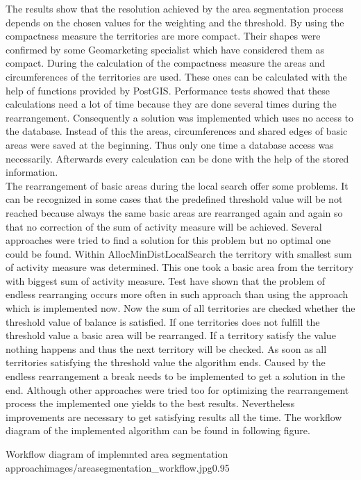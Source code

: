 The results show that the resolution achieved by the area segmentation process depends on the chosen values for the weighting and the threshold. By using the compactness measure the territories are more compact. Their shapes were confirmed by some Geomarketing specialist which have considered them as compact. During the calculation of the compactness measure the areas and circumferences of the territories are used. These ones can be calculated with the help of functions provided by PostGIS. Performance tests showed that these calculations need a lot of time because they are done several times during the rearrangement. Consequently a solution was implemented which uses no access to the database. Instead of this the areas, circumferences and shared edges of basic areas were saved at the beginning. Thus only one time a database access was necessarily. Afterwards every calculation can be done with the help of the stored information. \\
The rearrangement of basic areas during the local search offer some problems. It can be recognized in some cases that the predefined threshold value will be not reached because always the same basic areas are rearranged again and again so that no correction of the sum of activity measure will be achieved. Several approaches were tried to find a solution for this problem but no optimal one could be found. Within AllocMinDistLocalSearch the territory with smallest sum of activity measure was determined. This one took a basic area from the territory with biggest sum of activity measure. Test have shown that the problem of endless rearranging occurs more often in such approach than using the approach which is implemented now. Now the sum of all territories are checked whether the threshold value of balance is satisfied. If one territories does not fulfill the threshold value a basic area will be rearranged. If a territory satisfy the value nothing happens and thus the next territory will be checked. As soon as all territories satisfying the threshold value the algorithm ends. Caused by the endless rearrangement a break needs to be implemented to get a solution in the end. Although other approaches were tried too for optimizing the rearrangement process the implemented one yields to the best results. Nevertheless improvements are necessary to get satisfying results all the time. The workflow diagram of the implemented algorithm can be found in following figure. 

\begin{figurevarSize}{Workflow diagram of implemnted area segmentation approach}{images/areasegmentation_workflow.jpg}{0.95}\end{figurevarSize}

